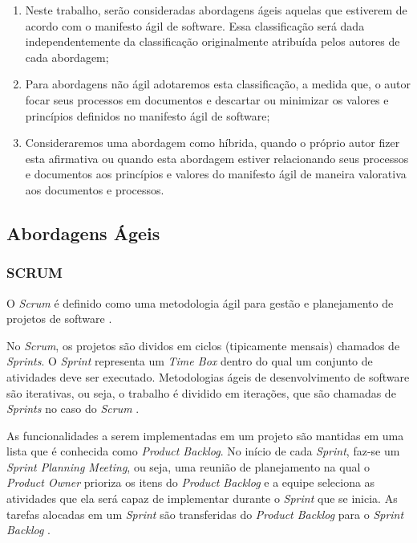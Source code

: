 \documentclass{acm_proc_article-sp}
\begin{document}
\begin{enumerate}
\item  Neste trabalho, serão consideradas abordagens ágeis aquelas que estiverem de acordo com o manifesto ágil de software. Essa classificação será dada independentemente da classificação originalmente atribuída pelos autores de cada abordagem;
\item Para abordagens não ágil adotaremos esta classificação, a medida que, o autor focar seus processos em documentos e descartar ou minimizar os valores e princípios definidos no manifesto ágil de software;
\item Consideraremos uma abordagem como híbrida, quando o próprio autor fizer esta afirmativa ou quando esta abordagem estiver relacionando seus processos e documentos aos princípios e valores do manifesto ágil de maneira valorativa aos documentos e processos.
\end{enumerate}

\subsection{Abordagens Ágeis}

\subsubsection{SCRUM}
O \textit{Scrum} é definido como uma metodologia ágil para gestão e planejamento de projetos de software \cite{scrum:agil}.

No \textit{Scrum}, os projetos são dividos em ciclos (tipicamente mensais) chamados de \textit{Sprints}. O \textit{Sprint} representa um \textit{Time Box} dentro do qual um conjunto de atividades deve ser executado. Metodologias ágeis de desenvolvimento de software são iterativas, ou seja, o trabalho é dividido em iterações, que são chamadas de \textit{Sprints} no caso do \textit{Scrum} \cite{scrum:agil}.

As funcionalidades a serem implementadas em um projeto são mantidas em uma lista que é conhecida como \textit{Product Backlog}. No início de cada \textit{Sprint}, faz-se um \textit{Sprint Planning Meeting}, ou seja, uma reunião de planejamento na qual o \textit{Product Owner} prioriza os itens do \textit{Product Backlog} e a equipe seleciona as atividades que ela será capaz de implementar durante o \textit{Sprint} que se inicia. As tarefas alocadas em um \textit{Sprint} são transferidas do \textit{Product Backlog} para o \textit{Sprint Backlog} \cite{scrum:agil}.
\end{document}
